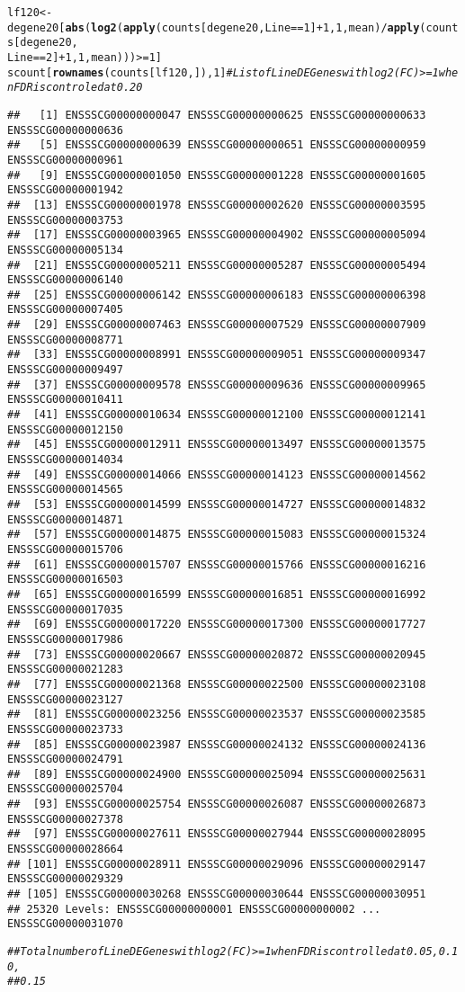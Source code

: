 \documentclass{article}\usepackage[]{graphicx}\usepackage[]{color}
\makeatletter
\newcommand{\hlnum}[1]{\textcolor[rgb]{0.686,0.059,0.569}{#1}}%
\newcommand{\hlcom}[1]{\textcolor[rgb]{0.678,0.584,0.686}{\textit{#1}}}%
\newcommand{\hlopt}[1]{\textcolor[rgb]{0,0,0}{#1}}%
\newcommand{\hlstd}[1]{\textcolor[rgb]{0.345,0.345,0.345}{#1}}%
\newcommand{\hlkwb}[1]{\textcolor[rgb]{0.69,0.353,0.396}{#1}}%
\newcommand{\hlkwd}[1]{\textcolor[rgb]{0.737,0.353,0.396}{\textbf{#1}}}%
\newenvironment{kframe}{%
 \def\at@end@of@kframe{}%
 \ifinner\ifhmode%
  \def\at@end@of@kframe{\end{minipage}}%
  \begin{minipage}{\columnwidth}%
 \fi\fi%
 \def\FrameCommand##1{\hskip\@totalleftmargin \hskip-\fboxsep
 \colorbox{shadecolor}{##1}\hskip-\fboxsep
     \hskip-\linewidth \hskip-\@totalleftmargin \hskip\columnwidth}%
 \MakeFramed {\advance\hsize-\width
   \@totalleftmargin\z@ \linewidth\hsize
   \@setminipage}}%
 {\par\unskip\endMakeFramed%
 \at@end@of@kframe}
\newenvironment{knitrout}{}{} %
\makeatother
\begin{document}
\begin{knitrout}
\begin{kframe}
\begin{alltt}
\hlstd{lf120} \hlkwb{<-} \hlstd{degene20[}\hlkwd{abs}\hlstd{(}\hlkwd{log2}\hlstd{(}\hlkwd{apply}\hlstd{(counts[degene20, Line} \hlopt{==} \hlnum{1}\hlstd{]} \hlopt{+} \hlnum{1}\hlstd{,} \hlnum{1}\hlstd{, mean)}\hlopt{/}\hlkwd{apply}\hlstd{(counts[degene20,}
    \hlstd{Line} \hlopt{==} \hlnum{2}\hlstd{]} \hlopt{+} \hlnum{1}\hlstd{,} \hlnum{1}\hlstd{, mean)))} \hlopt{>=} \hlnum{1}\hlstd{]}
\hlstd{scount[}\hlkwd{rownames}\hlstd{(counts[lf120, ]),} \hlnum{1}\hlstd{]}  \hlcom{# List of  Line DE Genes with log2(FC) >=1 when FDR is controled at 0.20}
\end{alltt}
\begin{verbatim}
##   [1] ENSSSCG00000000047 ENSSSCG00000000625 ENSSSCG00000000633 ENSSSCG00000000636
##   [5] ENSSSCG00000000639 ENSSSCG00000000651 ENSSSCG00000000959 ENSSSCG00000000961
##   [9] ENSSSCG00000001050 ENSSSCG00000001228 ENSSSCG00000001605 ENSSSCG00000001942
##  [13] ENSSSCG00000001978 ENSSSCG00000002620 ENSSSCG00000003595 ENSSSCG00000003753
##  [17] ENSSSCG00000003965 ENSSSCG00000004902 ENSSSCG00000005094 ENSSSCG00000005134
##  [21] ENSSSCG00000005211 ENSSSCG00000005287 ENSSSCG00000005494 ENSSSCG00000006140
##  [25] ENSSSCG00000006142 ENSSSCG00000006183 ENSSSCG00000006398 ENSSSCG00000007405
##  [29] ENSSSCG00000007463 ENSSSCG00000007529 ENSSSCG00000007909 ENSSSCG00000008771
##  [33] ENSSSCG00000008991 ENSSSCG00000009051 ENSSSCG00000009347 ENSSSCG00000009497
##  [37] ENSSSCG00000009578 ENSSSCG00000009636 ENSSSCG00000009965 ENSSSCG00000010411
##  [41] ENSSSCG00000010634 ENSSSCG00000012100 ENSSSCG00000012141 ENSSSCG00000012150
##  [45] ENSSSCG00000012911 ENSSSCG00000013497 ENSSSCG00000013575 ENSSSCG00000014034
##  [49] ENSSSCG00000014066 ENSSSCG00000014123 ENSSSCG00000014562 ENSSSCG00000014565
##  [53] ENSSSCG00000014599 ENSSSCG00000014727 ENSSSCG00000014832 ENSSSCG00000014871
##  [57] ENSSSCG00000014875 ENSSSCG00000015083 ENSSSCG00000015324 ENSSSCG00000015706
##  [61] ENSSSCG00000015707 ENSSSCG00000015766 ENSSSCG00000016216 ENSSSCG00000016503
##  [65] ENSSSCG00000016599 ENSSSCG00000016851 ENSSSCG00000016992 ENSSSCG00000017035
##  [69] ENSSSCG00000017220 ENSSSCG00000017300 ENSSSCG00000017727 ENSSSCG00000017986
##  [73] ENSSSCG00000020667 ENSSSCG00000020872 ENSSSCG00000020945 ENSSSCG00000021283
##  [77] ENSSSCG00000021368 ENSSSCG00000022500 ENSSSCG00000023108 ENSSSCG00000023127
##  [81] ENSSSCG00000023256 ENSSSCG00000023537 ENSSSCG00000023585 ENSSSCG00000023733
##  [85] ENSSSCG00000023987 ENSSSCG00000024132 ENSSSCG00000024136 ENSSSCG00000024791
##  [89] ENSSSCG00000024900 ENSSSCG00000025094 ENSSSCG00000025631 ENSSSCG00000025704
##  [93] ENSSSCG00000025754 ENSSSCG00000026087 ENSSSCG00000026873 ENSSSCG00000027378
##  [97] ENSSSCG00000027611 ENSSSCG00000027944 ENSSSCG00000028095 ENSSSCG00000028664
## [101] ENSSSCG00000028911 ENSSSCG00000029096 ENSSSCG00000029147 ENSSSCG00000029329
## [105] ENSSSCG00000030268 ENSSSCG00000030644 ENSSSCG00000030951
## 25320 Levels: ENSSSCG00000000001 ENSSSCG00000000002 ... ENSSSCG00000031070
\end{verbatim}
\begin{alltt}
\hlcom{## Total number of Line DE Genes with log2(FC) >=1 when FDR is controlled at 0.05, 0.10,}
\hlcom{## 0.15}


\end{alltt}
\end{kframe}
\end{knitrout}
\end{document}
